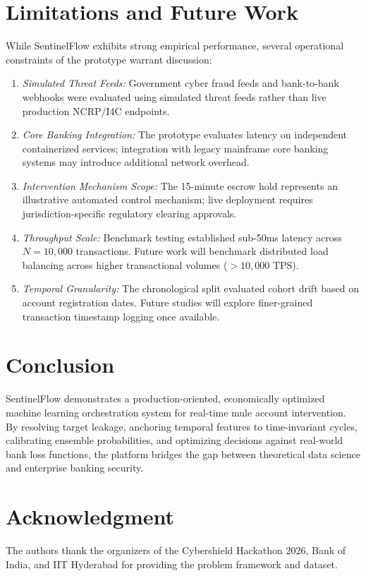 \documentclass[conference]{IEEEtran}
\begin{document}
\section{Limitations and Future Work}
While SentinelFlow exhibits strong empirical performance, several operational constraints of the prototype warrant discussion:
\begin{enumerate}
    \item \textit{Simulated Threat Feeds:} Government cyber fraud feeds and bank-to-bank webhooks were evaluated using simulated threat feeds rather than live production NCRP/I4C endpoints.
    \item \textit{Core Banking Integration:} The prototype evaluates latency on independent containerized services; integration with legacy mainframe core banking systems may introduce additional network overhead.
    \item \textit{Intervention Mechanism Scope:} The 15-minute escrow hold represents an illustrative automated control mechanism; live deployment requires jurisdiction-specific regulatory clearing approvals.
    \item \textit{Throughput Scale:} Benchmark testing established sub-50ms latency across $N = 10{,}000$ transactions. Future work will benchmark distributed load balancing across higher transactional volumes ($>10{,}000\text{ TPS}$).
    \item \textit{Temporal Granularity:} The chronological split evaluated cohort drift based on account registration dates. Future studies will explore finer-grained transaction timestamp logging once available.
\end{enumerate}

\section{Conclusion}
SentinelFlow demonstrates a production-oriented, economically optimized machine learning orchestration system for real-time mule account intervention. By resolving target leakage, anchoring temporal features to time-invariant cycles, calibrating ensemble probabilities, and optimizing decisions against real-world bank loss functions, the platform bridges the gap between theoretical data science and enterprise banking security.

\section*{Acknowledgment}
The authors thank the organizers of the Cybershield Hackathon 2026, Bank of India, and IIT Hyderabad for providing the problem framework and dataset.
\end{document}
